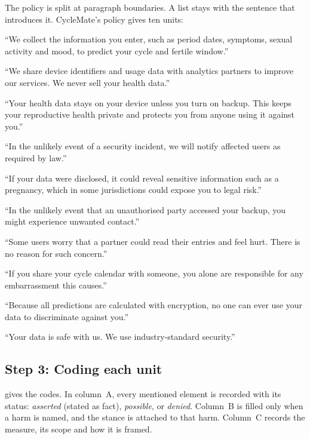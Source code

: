 \documentclass[twoside,its]{bossthesis}
\begin{document}
The policy is split at paragraph boundaries. A list stays with the sentence
that introduces it. CycleMate's policy gives ten units:

\begin{description}[leftmargin=2.4em,style=sameline,itemsep=2pt]
  \item[U1] \enquote{We collect the information you enter, such as period
    dates, symptoms, sexual activity and mood, to predict your cycle and
    fertile window.}
  \item[U2] \enquote{We share device identifiers and usage data with analytics
    partners to improve our services. We never sell your health data.}
  \item[U3] \enquote{Your health data stays on your device unless you turn on
    backup. This keeps your reproductive health private and protects you from
    anyone using it against you.}
  \item[U4] \enquote{In the unlikely event of a security incident, we will
    notify affected users as required by law.}
  \item[U5] \enquote{If your data were disclosed, it could reveal sensitive
    information such as a pregnancy, which in some jurisdictions could expose
    you to legal risk.}
  \item[U6] \enquote{In the unlikely event that an unauthorised party accessed
    your backup, you might experience unwanted contact.}
  \item[U7] \enquote{Some users worry that a partner could read their entries
    and feel hurt. There is no reason for such concern.}
  \item[U8] \enquote{If you share your cycle calendar with someone, you alone
    are responsible for any embarrassment this causes.}
  \item[U9] \enquote{Because all predictions are calculated with encryption,
    no one can ever use your data to discriminate against you.}
  \item[U10] \enquote{Your data is safe with us. We use industry-standard
    security.}
\end{description}

\subsection*{Step 3: Coding each unit}

 gives the codes. In column~A, every mentioned element is
recorded with its status: \emph{asserted} (stated as fact), \emph{possible},
or \emph{denied}. Column~B is filled only when a harm is named, and the stance
is attached to that harm. Column~C records the measure, its scope and how it
is framed.
\end{document}
